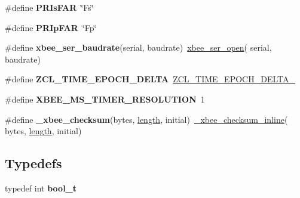 \begin{DoxyCompactItemize}
\item 
\hypertarget{group__hal__rabbit_ga379022d2cd3136d8f3500c88658056b7}{\#define {\bfseries P\-R\-Is\-F\-A\-R}~\char`\"{}Fs\char`\"{}}\label{group__hal__rabbit_ga379022d2cd3136d8f3500c88658056b7}

\item 
\hypertarget{group__hal__rabbit_ga8429a3beb3448b89cb7c3877b8909369}{\#define {\bfseries P\-R\-Ip\-F\-A\-R}~\char`\"{}Fp\char`\"{}}\label{group__hal__rabbit_ga8429a3beb3448b89cb7c3877b8909369}

\item 
\hypertarget{group__hal__rabbit_gaaa4b5b262a136fb7f4dee6817f094576}{\#define {\bfseries xbee\-\_\-ser\-\_\-baudrate}(serial, baudrate)~\hyperlink{group__xbee__serial_gaa615a221dd69c17ee2989c281f2bf04a}{xbee\-\_\-ser\-\_\-open}( serial, baudrate)}\label{group__hal__rabbit_gaaa4b5b262a136fb7f4dee6817f094576}

\item 
\hypertarget{group__hal__rabbit_ga503caf44f78cc52dc196c413cd6c78ab}{\#define {\bfseries Z\-C\-L\-\_\-\-T\-I\-M\-E\-\_\-\-E\-P\-O\-C\-H\-\_\-\-D\-E\-L\-T\-A}~\hyperlink{group__hal_gaa1c89a351daab5e3d33a2dc48f85f9a4}{Z\-C\-L\-\_\-\-T\-I\-M\-E\-\_\-\-E\-P\-O\-C\-H\-\_\-\-D\-E\-L\-T\-A\-\_}}\label{group__hal__rabbit_ga503caf44f78cc52dc196c413cd6c78ab}

\item 
\hypertarget{group__hal__rabbit_ga5cbeea4d9344138b657f78ad38813584}{\#define {\bfseries X\-B\-E\-E\-\_\-\-M\-S\-\_\-\-T\-I\-M\-E\-R\-\_\-\-R\-E\-S\-O\-L\-U\-T\-I\-O\-N}~1}\label{group__hal__rabbit_ga5cbeea4d9344138b657f78ad38813584}

\item 
\hypertarget{group__hal__rabbit_gaf6deb539ce1ad71e3dfcbaeb8086a0e7}{\#define {\bfseries \-\_\-xbee\-\_\-checksum}(bytes, \hyperlink{group__zdo_gab2b3adeb2a67e656ff030b56727fd0ac}{length}, initial)~\hyperlink{group__hal__rabbit_ga02da89986736815045b1a11e1c58733e}{\-\_\-xbee\-\_\-checksum\-\_\-inline}( bytes, \hyperlink{group__zdo_gab2b3adeb2a67e656ff030b56727fd0ac}{length}, initial)}\label{group__hal__rabbit_gaf6deb539ce1ad71e3dfcbaeb8086a0e7}

\end{DoxyCompactItemize}
\subsection*{Typedefs}
\begin{DoxyCompactItemize}
\item 
\hypertarget{group__hal__rabbit_ga812d16e5494522586b3784e55d479912}{typedef int {\bfseries bool\-\_\-t}}\label{group__hal__rabbit_ga812d16e5494522586b3784e55d479912}

\end{DoxyCompactItemize}
